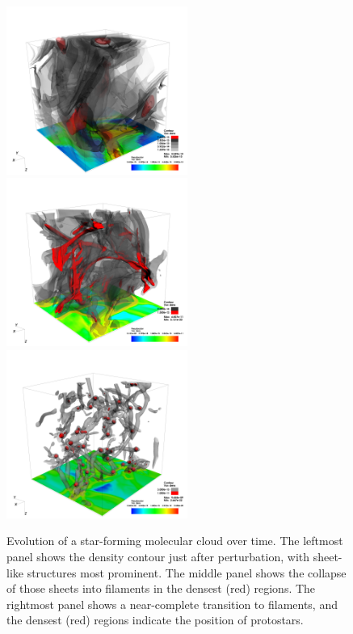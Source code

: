 \documentclass[iop]{emulateapj}
\begin{document}
\begin{figure}[ht]
	\begin{center}
	\includegraphics[height=5.5cm,clip=true]{Graphics/bbb_0375_dens_contour_00500000.png}%
	\includegraphics[height=5.5cm,clip=true]{Graphics/bbb_0375_dens_contour_0200_0002.png}%
	\includegraphics[height=5.5cm,clip=true]{Graphics/bbb_0375_dens_contour0000.png}
	\end{center}
	\caption{Evolution of a star-forming molecular cloud over time. The leftmost panel shows the density contour just after perturbation, with sheet-like structures most prominent. The middle panel shows the collapse of those sheets into filaments in the densest (red) regions. The rightmost panel shows a near-complete transition to filaments, and the densest (red) regions indicate the position of protostars.}
	\label{f:cloudevolution}
	\end{figure}
\end{document}
